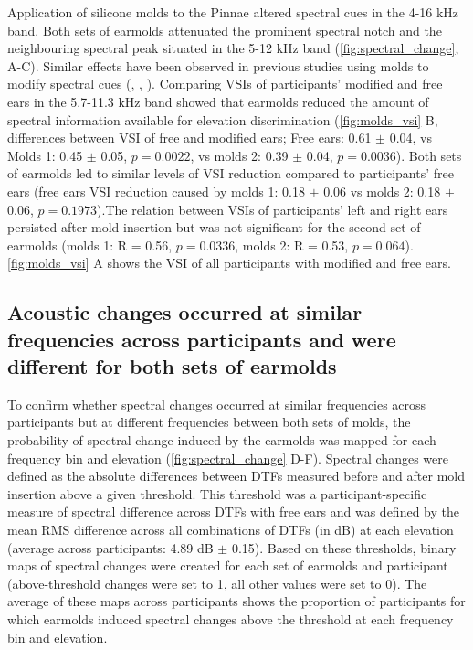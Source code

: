 Application of silicone molds to the Pinnae altered spectral cues in the 4-16 kHz band. Both sets of earmolds attenuated the prominent spectral notch and the neighbouring spectral peak situated in the 5-12 kHz band (\cref{fig:spectral_change}, A-C). Similar effects have been observed in previous studies using molds to modify spectral cues (\citet{trapeau_fast_2016}, \citet{wanrooij_relearning_2005}, \citet{hofman_relearning_1998}). Comparing VSIs of participants' modified and free ears in the 5.7-11.3 kHz band showed that earmolds reduced the amount of spectral information available for elevation discrimination (\cref{fig:molds_vsi} B, differences between VSI of free and modified ears; Free ears: 0.61 $\pm$ 0.04, vs Molds 1: 0.45 $\pm$ 0.05, $p = 0.0022$, vs molds 2: 0.39 $\pm$ 0.04, $p = 0.0036$). Both sets of earmolds led to similar levels of VSI reduction compared to participants' free ears (free ears VSI reduction caused by molds 1: 0.18 $\pm$ 0.06 vs molds 2: 0.18 $\pm$ 0.06, $p = 0.1973$).The relation between VSIs of participants' left and right ears persisted after mold insertion but was not significant for the second set of earmolds (molds 1: R = 0.56, $p = 0.0336$, molds 2: R = 0.53, $p = 0.064$). \cref{fig:molds_vsi} A shows the VSI of all participants with modified and free ears.

\subsection{Acoustic changes occurred at similar frequencies across participants and were different for both sets of earmolds}

To confirm whether spectral changes occurred at similar frequencies across participants but at different frequencies between both sets of molds, the probability of spectral change induced by the earmolds was mapped for each frequency bin and elevation (\cref{fig:spectral_change} D-F). Spectral changes were defined as the absolute differences between DTFs measured before and after mold insertion above a given threshold. This threshold was a participant-specific measure of spectral difference across DTFs with free ears and was defined by the mean RMS difference across all combinations of DTFs (in dB) at each elevation (average across participants: 4.89 dB $\pm$ 0.15). Based on these thresholds, binary maps of spectral changes were created for each set of earmolds and participant (above-threshold changes were set to 1, all other values were set to 0). The average of these maps across participants shows the proportion of participants for which earmolds induced spectral changes above the threshold at each frequency bin and elevation.

